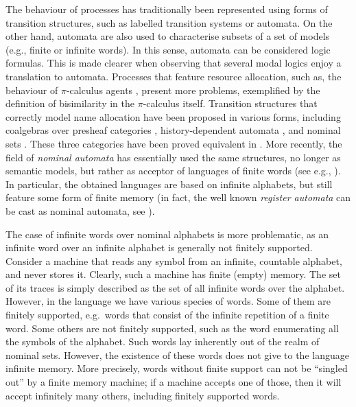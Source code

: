 


The behaviour of processes has traditionally been represented using forms of transition structures, such as labelled transition systems or automata. On the other hand, automata are also used to characterise subsets of a set of models (e.g., finite or infinite words). In this sense, automata can be considered logic formulas. This is made clearer when observing that several modal logics enjoy a translation to automata. Processes that feature resource allocation, such as, the behaviour of $\pi$-calculus agents \cite{?}, present more problems, exemplified by the definition of bisimilarity in the $\pi$-calculus itself. Transition structures that correctly model name allocation have been proposed in various forms, including coalgebras over presheaf categories \cite{?}, history-dependent automata \cite{?}, and nominal sets \cite{?}. These three categories have been proved equivalent in \cite{?,?}. More recently, the field of \emph{nominal automata} has essentially used the same structures, no longer as semantic models, but rather as acceptor of languages of finite words (see e.g., \cite{Tze11,KST12,GC11,BojanczykKL11}). In particular, the obtained languages are based on infinite alphabets, but still feature some form of finite memory (in fact, the well known \emph{register automata} can be cast as nominal automata, see \cite{?}). 


The case of infinite words over nominal alphabets is more problematic, as an infinite word over an infinite alphabet is generally not finitely supported. Consider a machine that reads any symbol from an infinite, countable alphabet, and never stores it. Clearly, such a machine has finite (empty) memory. The set of its traces is simply described as the set of all infinite words over the alphabet. However, in the language we have various species of words. Some of them are finitely supported, e.g.\ words that consist of the infinite repetition of a finite word. Some others are not finitely supported, such as the word enumerating all the symbols of the alphabet. Such words lay inherently out of the realm of nominal sets. However, the existence of these words does not give to the language infinite memory. More precisely,  words without finite support can not be ``singled out'' by a finite memory machine; if a machine accepts one of those, then it will accept infinitely many others, including finitely supported words.  

